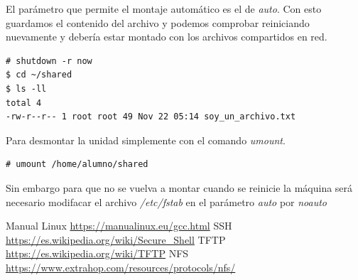 \documentclass[12pt]{article}
\begin{document}
El parámetro que permite el montaje automático es el de \emph{auto}. Con esto guardamos el contenido del archivo y podemos comprobar reiniciando nuevamente y debería estar montado con los archivos compartidos en red.

\begin{lstlisting}[frame=single]
# shutdown -r now
$ cd ~/shared
$ ls -ll
total 4
-rw-r--r-- 1 root root 49 Nov 22 05:14 soy_un_archivo.txt
\end{lstlisting}

Para desmontar la unidad simplemente con el comando \emph{umount}.

\begin{lstlisting}[frame=single]
# umount /home/alumno/shared
\end{lstlisting}

 Sin embargo para que no se vuelva a montar cuando se reinicie la máquina será necesario modifacar el archivo \emph{/etc/fstab} en el parámetro \emph{auto} por \emph{noauto}
\newpage
\begin{thebibliography}{99}
 Manual Linux \url{https://manualinux.eu/gcc.html}
 SSH \url{https://es.wikipedia.org/wiki/Secure_Shell}
 TFTP \url{https://es.wikipedia.org/wiki/TFTP}
 NFS \url{https://www.extrahop.com/resources/protocols/nfs/}
\end{thebibliography}
\end{document}
